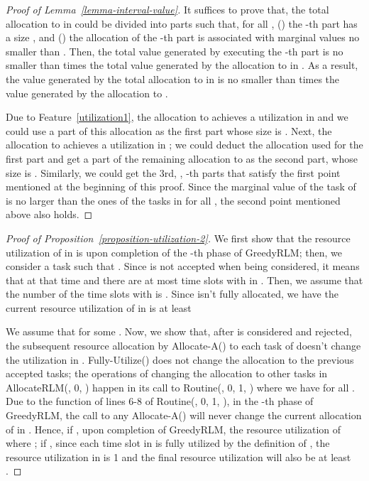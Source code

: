 \documentclass[10pt,journal,compsoc]{IEEEtran}
\newcommand{\rmnum}[1]{\romannumeral #1}
\begin{document}
\begin{proof}[Proof of Lemma~\ref{lemma-interval-value}]
It suffices to prove that, the total allocation to  in  could be divided into  parts such that, for all , (\rmnum{1}) the -th part has a size , and (\rmnum{2}) the allocation of the -th part is associated with marginal values no smaller than . Then, the total value generated by executing the -th part is no smaller than  times the total value generated by the allocation to  in . As a result, the value generated by the total allocation to  in  is no smaller than  times the value generated by the allocation to .


Due to Feature~\ref{utilization1}, the allocation to  achieves a utilization  in  and we could use a part of this allocation as the first part whose size is . Next, the allocation to  achieves a utilization  in ; we could deduct the allocation used for the first part and get a part of the remaining allocation to  as the second part, whose size is . Similarly, we could get the 3rd, , -th parts that satisfy the first point mentioned at the beginning of this proof. Since the marginal value of the task of  is no larger than the ones of the tasks in  for all , the second point mentioned above also holds.
\end{proof}


\begin{proof}[Proof of Proposition~\ref{proposition-utilization-2}]
We first show that the resource utilization of  in  is  upon completion of the -th phase of GreedyRLM; then, we consider a task  such that . Since  is not accepted when being considered, it means that  at that time and there are at most  time slots  with  in . Then, we assume that the number of the time slots  with  is . Since  isn't fully allocated, we have the current resource utilization of  in  is at least



We assume that  for some . Now, we show that, after  is considered and rejected, the subsequent resource allocation by Allocate-A() to each task  of  doesn't change the utilization in . Fully-Utilize() does not change the allocation to the previous accepted tasks; the operations of changing the allocation to other tasks in AllocateRLM(, 0, ) happen in its call to Routine(, 0, 1, ) where we have  for all . Due to the function of lines 6-8 of Routine(, 0, 1, ), in the -th phase of GreedyRLM, the call to any Allocate-A() will never change the current allocation of  in . Hence, if , upon completion of GreedyRLM, the resource utilization of  where ; if , since each time slot in  is fully utilized by the definition of , the resource utilization in  is 1 and the final resource utilization will also be at least .
\end{proof}
\end{document}
